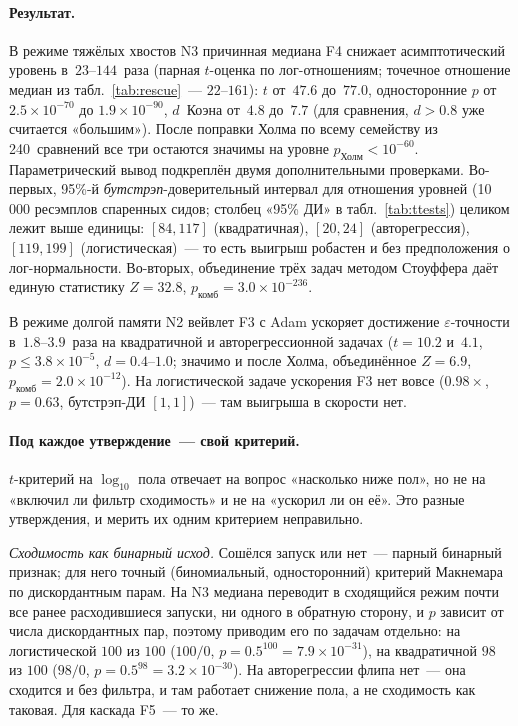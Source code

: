 \documentclass[conference]{IEEEtran}
\begin{document}
\paragraph{Результат.} В режиме тяжёлых хвостов N3 причинная медиана F4
снижает асимптотический уровень в~$23$--$144$~раза (парная $t$-оценка по
лог-отношениям; точечное отношение медиан из табл.~\ref{tab:rescue}~---
$22$--$161$): $t$ от~$47.6$ до~$77.0$, односторонние $p$ от
$2.5\times10^{-70}$ до $1.9\times10^{-90}$, $d$~Коэна от~$4.8$ до~$7.7$
(для сравнения, $d>0.8$ уже считается «большим»). После поправки Холма по
всему семейству из 240~сравнений все три остаются значимы на уровне
$p_{\text{Холм}}<10^{-60}$. Параметрический вывод подкреплён двумя
дополнительными проверками. Во-первых, 95\%-й \emph{бутстрэп}-доверительный
интервал для отношения уровней (10\,000 ресэмплов спаренных сидов; столбец
«95\% ДИ» в табл.~\ref{tab:ttests}) целиком лежит выше
единицы: $[84,117]$ (квадратичная), $[20,24]$ (авторегрессия),
$[119,199]$ (логистическая)~--- то есть выигрыш робастен и без
предположения о лог-нормальности. Во-вторых, объединение трёх задач
методом Стоуффера даёт единую статистику $Z=32.8$,
$p_{\text{комб}}=3.0\times10^{-236}$.

В режиме долгой памяти N2 вейвлет F3 с Adam
ускоряет достижение $\varepsilon$-точности в~$1.8$--$3.9$~раза на
квадратичной и авторегрессионной задачах ($t=10.2$ и~$4.1$,
$p\le3.8\times10^{-5}$, $d=0.4$--$1.0$; значимо и после Холма, объединённое
$Z=6.9$, $p_{\text{комб}}=2.0\times10^{-12}$). На логистической
задаче ускорения F3 нет вовсе ($0.98\times$, $p=0.63$,
бутстрэп-ДИ $[1,1]$)~--- там выигрыша в скорости нет.

\paragraph{Под каждое утверждение~--- свой критерий.} $t$-критерий на
$\log_{10}$ пола отвечает на вопрос «насколько ниже пол», но не на «включил
ли фильтр сходимость» и не на «ускорил ли он её». Это разные утверждения, и
мерить их одним критерием неправильно.

\emph{Сходимость как бинарный исход.} Сошёлся запуск или нет~--- парный
бинарный признак; для него точный (биномиальный, односторонний) критерий
Макнемара по дискордантным парам. На N3 медиана переводит в сходящийся режим
почти все ранее расходившиеся запуски, ни одного в обратную сторону, и $p$
зависит от числа дискордантных пар, поэтому приводим его по задачам отдельно:
на логистической $100$ из $100$ ($100/0$, $p=0.5^{100}=7.9\times10^{-31}$), на
квадратичной $98$ из $100$ ($98/0$, $p=0.5^{98}=3.2\times10^{-30}$). На
авторегрессии флипа нет~--- она сходится и без фильтра, и там работает снижение
пола, а не сходимость как таковая. Для каскада F5~--- то же.
\end{document}
